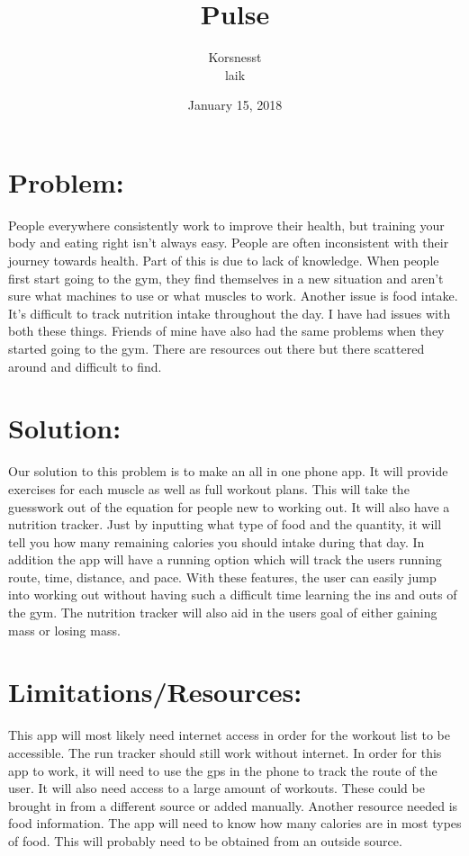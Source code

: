 \documentclass[12pt]{article}
\title{Pulse}
\author{Korsnesst\\ laik}
\date{January 15, 2018}
\begin{document}
\maketitle



\section*{Problem:}
People everywhere consistently work to improve their health, but training your body and eating right isn’t always easy. People are often inconsistent with their journey towards health. Part of this is due to lack of knowledge. When people first start going to the gym, they find themselves in a new situation and aren’t sure what machines to use or what muscles to work. Another issue is food intake. It’s difficult to track nutrition intake throughout the day. I have had issues with both these things. Friends of mine have also had the same problems when they started going to the gym. There are resources out there but there scattered around and difficult to find.

\section*{Solution:}
Our solution to this problem is to make an all in one phone app. It will provide exercises for each muscle as well as full workout plans. This will take the guesswork out of the equation for people new to working out. It will also have a nutrition tracker. Just by inputting what type of food and the quantity, it will tell you how many remaining calories you should intake during that day. In addition the app will have a running option which will track the users running route, time, distance, and pace. With these features, the user can easily jump into working out without having such a difficult time learning the ins and outs of the gym. The nutrition tracker will also aid in the users goal of either gaining mass or losing mass.


\section*{Limitations/Resources:}
This app will most likely need internet access in order for the workout list to be accessible. The run tracker should still work without internet. In order for this app to work, it will need to use the gps in the phone to track the route of the user. It will also need access to a large amount of workouts. These could be brought in from a different source or added manually. Another resource needed is food information. The app will need to know how many calories are in most types of food. This will probably need to be obtained from an outside source.
\end{document}
